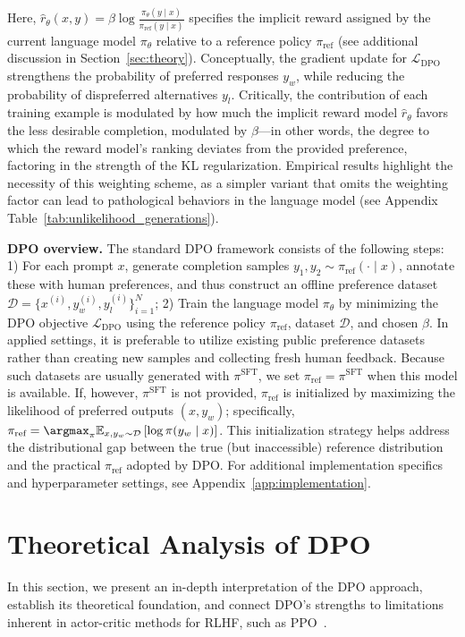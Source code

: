 Here, $\hat{r}_\theta(x, y) = \beta \log \frac{\pi_\theta(y \mid x)}{\pi_\text{ref}(y \mid x)}$ specifies the implicit reward assigned by the current language model $\pi_\theta$ relative to a reference policy $\pi_\text{ref}$ (see additional discussion in Section~\ref{sec:theory}). Conceptually, the gradient update for $\mathcal{L}_\text{DPO}$ strengthens the probability of preferred responses $y_w$, while reducing the probability of dispreferred alternatives $y_l$. Critically, the contribution of each training example is modulated by how much the implicit reward model $\hat{r}_\theta$ favors the less desirable completion, modulated by $\beta$—in other words, the degree to which the reward model's ranking deviates from the provided preference, factoring in the strength of the KL regularization. Empirical results highlight the necessity of this weighting scheme, as a simpler variant that omits the weighting factor can lead to pathological behaviors in the language model (see Appendix Table~\ref{tab:unlikelihood_generations}).

\textbf{DPO overview.} The standard DPO framework consists of the following steps: 1) For each prompt $x$, generate completion samples $y_1, y_2 \sim \pi_\text{ref}(\cdot \mid x)$, annotate these with human preferences, and thus construct an offline preference dataset $\mathcal{D} = \{x^{(i)}, y_w^{(i)}, y_l^{(i)}\}_{i=1}^N$; 2) Train the language model $\pi_\theta$ by minimizing the DPO objective $\mathcal{L}_\text{DPO}$ using the reference policy $\pi_\text{ref}$, dataset $\mathcal{D}$, and chosen $\beta$. 
In applied settings, it is preferable to utilize existing public preference datasets rather than creating new samples and collecting fresh human feedback. Because such datasets are usually generated with $\pi^\text{SFT}$, we set $\pi_\text{ref} = \pi^\text{SFT}$ when this model is available. If, however, $\pi^\text{SFT}$ is not provided, $\pi_\text{ref}$ is initialized by maximizing the likelihood of preferred outputs ${(x, y_w)}$; specifically, $\pi_\text{ref} = \argmax_{\pi}\mathbb{E}_{x, y_w \sim \mathcal{D}}\left[\log \pi(y_w \mid x)\right]$. This initialization strategy helps address the distributional gap between the true (but inaccessible) reference distribution and the practical $\pi_\text{ref}$ adopted by DPO. For additional implementation specifics and hyperparameter settings, see Appendix~\ref{app:implementation}.

\section{Theoretical Analysis of DPO} In this section, we present an in-depth interpretation of the DPO approach, establish its theoretical foundation, and connect DPO’s strengths to limitations inherent in actor-critic methods for RLHF, such as PPO~\cite{schulman2017proximal}.

